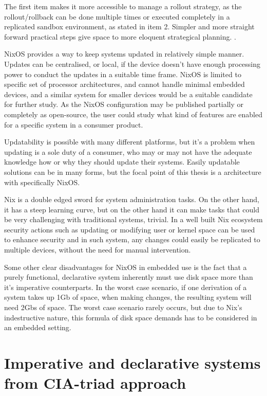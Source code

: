 The first item makes it more accessible to manage a rollout strategy, as the rollout/rollback can be done multiple times or executed completely in a replicated sandbox environment, as stated in item 2. Simpler and more straight forward practical steps give space to more eloquent strategical planning. \cite{kandoi2021operating}.

NixOS provides a way to keep systems updated in relatively simple manner. Updates can be centralised, or local, if the device doesn't have enough processing power to conduct the updates in a suitable time frame. NixOS is limited to specific set of processor architectures, and cannot handle minimal embedded devices, and a similar system for smaller devices would be a suitable candidate for further study. As the NixOS configuration may be published partially or completely as open-source, the user could study what kind of features are enabled for a specific system in a consumer product.

Updatability is possible with many different platforms, but it's a problem when updating is a sole duty of a consumer, who may or may not have the adequate knowledge how or why they should update their systems. Easily updatable solutions can be in many forms, but the focal point of this thesis is a architecture with specifically NixOS.

Nix is a double edged sword for system administration tasks. On the other hand, it has a steep learning curve, but on the other hand it can make tasks that could be very challenging with traditional systems, trivial. In a well built Nix ecosystem security actions such as updating or modifying user or kernel space can be used to enhance security and in such system, any changes could easily be replicated to multiple devices, without the need for manual intervention. 

Some other clear disadvantages for NixOS in embedded use is the fact that a purely functional, declarative system inherently must use disk space more than it's imperative counterparts. In the worst case scenario, if one derivation of a system takes up 1Gb of space, when making changes, the resulting system will need 2Gbs of space. The worst case scenario rarely occurs, but due to Nix's indestructive nature, this formula of disk space demands has to be considered in an embedded setting. \cite{dolstra2007purely}

\section{Imperative and declarative systems from CIA-triad approach}

